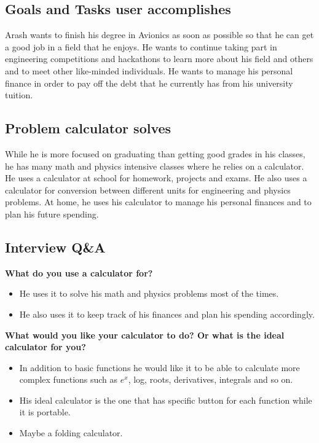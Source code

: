 \documentclass{article}
\begin{document}
\subsection*{Goals and Tasks user accomplishes}
Arash wants to finish his degree in Avionics as soon as possible so that he can get a good job in a field that he enjoys. He wants to continue taking part in engineering competitions and hackathons to learn more about his field and others and to meet other like-minded individuals. He wants to manage his personal finance in order to pay off the debt that he currently has from his university tuition.

\subsection*{Problem calculator solves}
While he is more focused on graduating than getting good grades in his classes, he has many math and physics intensive classes where he relies on a calculator. He uses a calculator at school for homework, projects and exams. He also uses a calculator for conversion between different units for engineering and physics problems. At home, he uses his calculator to manage his personal finances and to plan his future spending. 
\pagebreak

\subsection*{Interview Q\&A}
\textbf{What do you use a calculator for?}
\begin{itemize}
\itemsep0em 
\item He uses it to solve his math and physics problems most of the times. 
\item He also uses it to keep track of his finances and plan his spending accordingly.
\end{itemize}

\textbf{What would you like your calculator to do? Or what is the ideal calculator for you?}
\begin{itemize}
\itemsep0em 
\item In addition to basic functions he would like it to be able to calculate more complex functions such as $e^x$, log, roots, derivatives, integrals and so on.
\item His ideal calculator is the one that has specific button for each function while it is portable. 
\item Maybe a folding calculator.
\end{itemize}
\end{document}
